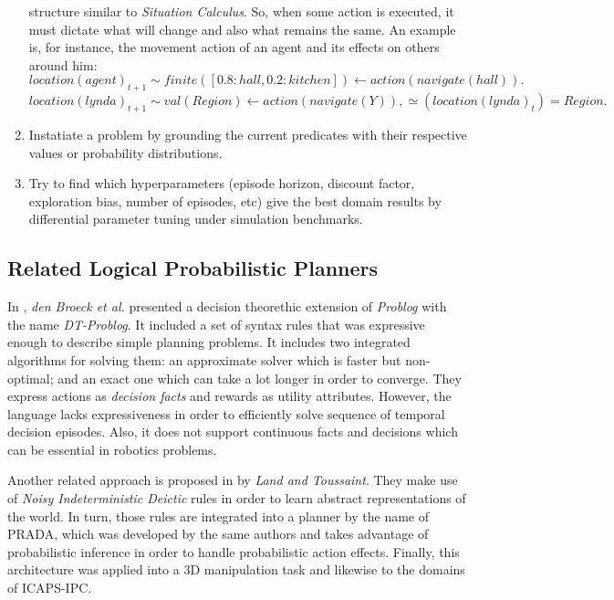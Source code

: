 \begin{enumerate}
  structure similar to \textit{Situation Calculus}. So, when
  some action is executed, it must dictate what will change and also what
  remains the same. An example is, for instance, the movement action of an agent
  and its effects on others around him:
  \begin{equation}
    location(agent)_{t+1} \sim finite([0.8:hall, 0.2:kitchen]) \leftarrow action(navigate(hall)).
    \label{eq:log_trans1}
  \end{equation}
  \begin{equation}
    location(lynda)_{t+1} \sim val(Region) \leftarrow action(navigate(Y)), \simeq(location(lynda)_t) = Region.
    \label{eq:log_trans2}
  \end{equation}

  \item Instatiate a problem by grounding the current predicates with their
  respective values or probability distributions.
  \item Try to find which hyperparameters (episode horizon, discount factor,
  exploration bias, number of episodes, etc) give the best domain results
  by differential parameter tuning under simulation benchmarks.
\end{enumerate}


\subsection{Related Logical Probabilistic Planners}
\label{subsubsection:rlpp}

In \cite{van2010dtproblog}, \textit{den Broeck et al.} presented a decision theorethic extension of
\textit{Problog} with the name \textit{DT-Problog}. It included a set of syntax rules that was 
expressive enough to describe simple planning problems. It includes two integrated algorithms for
solving them: an approximate solver which is faster but non-optimal; and an exact one which can 
take a lot longer in order to converge. They express actions as \textit{decision facts} and rewards
as utility attributes. However, the language lacks expressiveness in order to efficiently solve 
sequence of temporal decision episodes. Also, it does not support continuous facts and decisions which
can be essential in robotics problems.

Another related approach is proposed in \cite{lang2010planning} by \textit{Land and Toussaint}.
They make use of \textit{Noisy Indeterministic Deictic} rules in order to learn abstract representations
of the world. In turn, those rules are integrated into a planner by the name of \gls{PRADA}, which was
developed by the same authors and takes advantage of probabilistic inference in order to handle 
probabilistic action effects. Finally, this architecture was applied into a 3D manipulation task and
likewise to the domains of \gls{ICAPS-IPC}.

